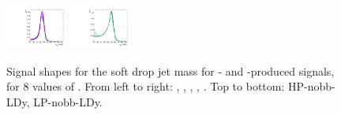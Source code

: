 \begin{figure}[htbp]
  \includegraphics[width=0.18\textwidth]{fig/2Dfit/templateSignalVsMX_fromDC_WprToWZ_MJJ_mu_LP_nobb_LDy.pdf}
  \includegraphics[width=0.18\textwidth]{fig/2Dfit/templateSignalVsMX_fromDC_WprToWH_MJJ_mu_LP_nobb_LDy.pdf}\\
  \caption{
    Signal shapes for the soft drop jet mass \MJ for \ggF- and \DY-produced signals, for 8 values of \MX.
    From left to right: \GBulktoWW, \RadtoWW, \ZprtoWW, \WprtoWZ, \WprtoWH.
    Top to bottom: HP-nobb-LDy, LP-nobb-LDy.
  }
  \label{fig:MJJShapes_NonVBF_LDy_Run2}
\end{figure}


